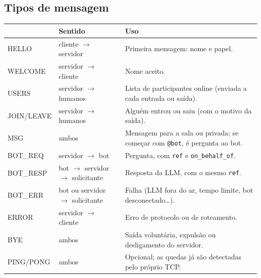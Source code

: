 \documentclass[11pt,a4paper]{article}
\newcommand{\cod}[1]{\texttt{#1}}
\begin{document}
\subsection{Tipos de mensagem}
\begin{center}
\small
\begin{tabularx}{\linewidth}{>{\ttfamily}l l X}
\toprule
{\normalfont\bfseries Tipo} & \textbf{Sentido} & \textbf{Uso} \\
\midrule
HELLO      & cliente $\to$ servidor & Primeira mensagem: nome e papel. \\
WELCOME    & servidor $\to$ cliente & Nome aceito. \\
USERS      & servidor $\to$ humanos & Lista de participantes online (enviada a cada entrada ou saída). \\
JOIN/LEAVE & servidor $\to$ humanos & Alguém entrou ou saiu (com o motivo da saída). \\
MSG        & ambos & Mensagem para a sala ou privada; se começar com \cod{@bot}, é pergunta ao bot. \\
BOT\_REQ   & servidor $\to$ bot & Pergunta, com \cod{ref} e \cod{on\_behalf\_of}. \\
BOT\_RESP  & bot $\to$ servidor $\to$ solicitante & Resposta da LLM, com o mesmo \cod{ref}. \\
BOT\_ERR   & bot ou servidor $\to$ solicitante & Falha (LLM fora do ar, tempo limite, bot desconectado\ldots). \\
ERROR      & servidor $\to$ cliente & Erro de protocolo ou de roteamento. \\
BYE        & ambos & Saída voluntária, expulsão ou desligamento do servidor. \\
PING/PONG  & ambos & Opcional; as quedas já são detectadas pelo próprio TCP. \\
\bottomrule
\end{tabularx}
\end{center}
\end{document}
